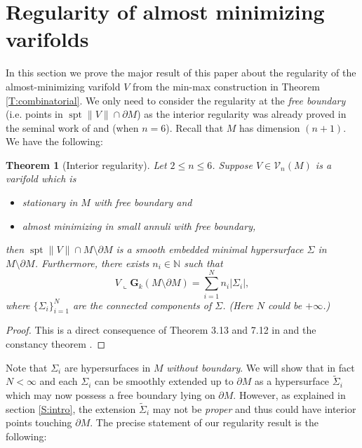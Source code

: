 \documentclass[10pt]{amsart}
\newtheorem{theorem}{Theorem}[section]
\theoremstyle{definition}
\theoremstyle{remark}
\newtheorem{remark}[theorem]{Remark}
\numberwithin{equation}{section}
\newcommand{\V}{\mathcal{V}}
\newcommand{\lc}{\llcorner}
\newcommand{\Gr}{\mathbf{G}}
\newcommand{\spt}{\operatorname{spt}}
\begin{document}
\section{Regularity of almost minimizing varifolds}
\label{S:regam}


In this section we prove the major result of this paper about the regularity of the almost-minimizing varifold $V$ from the min-max construction in Theorem \ref{T:combinatorial}. We only need to consider the regularity at the \emph{free boundary} (i.e. points in $\spt \|V\| \cap \partial M$) as the interior regularity was already proved in the seminal work of \cite{Pitts} and \cite{Schoen-Simon81} (when $n=6$). Recall that $M$ has dimension $(n+1)$. We have the following:


\begin{theorem}[Interior regularity]
\label{T:interior-regularity}
Let $2 \leq n \leq 6$. Suppose $V \in \V_n(M)$ is a varifold which is 
\begin{itemize}
\item stationary in $M$ with free boundary and 
\item almost minimizing in small annuli with free boundary,
\end{itemize}
then $\spt \|V\| \cap M \setminus \partial M$ is a smooth embedded minimal hypersurface $\Sigma$ in $M \setminus \partial M$. Furthermore, there exists $n_i \in \mathbb{N}$ such that
\[ V \lc \Gr_k(M \setminus \partial M)= \sum_{i=1}^N n_i |\Sigma_i|, \]
where $\{\Sigma_i\}_{i=1}^N$ are the connected components of $\Sigma$. (Here $N$ could be $+\infty$.)
\end{theorem}
\begin{proof}
This is a direct consequence of Theorem 3.13 and 7.12 in \cite{Pitts} and the constancy theorem \cite[2.4(5)]{Pitts}.
\end{proof}


Note that $\Sigma_i$ are hypersurfaces in $M$ \emph{without boundary}. We will show that in fact $N < \infty$ and each $\Sigma_i$ can be smoothly extended up to $\partial M$ as a hypersurface $\widetilde{\Sigma}_i$ which may now possess a free boundary lying on $\partial M$. However, as explained in section \ref{S:intro}, the extension $\widetilde{\Sigma}_i$ may not be \emph{proper} and thus could have interior points touching $\partial M$. The precise statement of our regularity result is the following:
\end{document}
